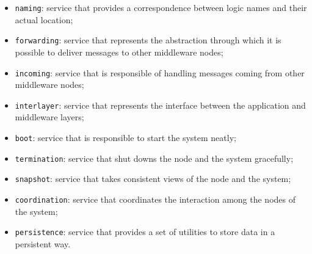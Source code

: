 \begin{itemize}
  \item \texttt{naming}: service that provides a correspondence between logic
    names and their actual location;
  \item \texttt{forwarding}: service that represents the abstraction through
    which it is possible to deliver messages to other middleware nodes;
  \item \texttt{incoming}: service that is responsible of handling messages
    coming from other middleware nodes;
  \item \texttt{interlayer}: service that represents the interface between
    the application and middleware layers;
  \item \texttt{boot}: service that is responsible to start the system neatly;
  \item \texttt{termination}: service that shut downs the node and the system
    gracefully;
  \item \texttt{snapshot}: service that takes consistent views of the node and
    the system;
  \item \texttt{coordination}: service that coordinates the interaction among
    the nodes of the system;
  \item \texttt{persistence}: service that provides a set of utilities to
    store data in a persistent way.
\end{itemize}










